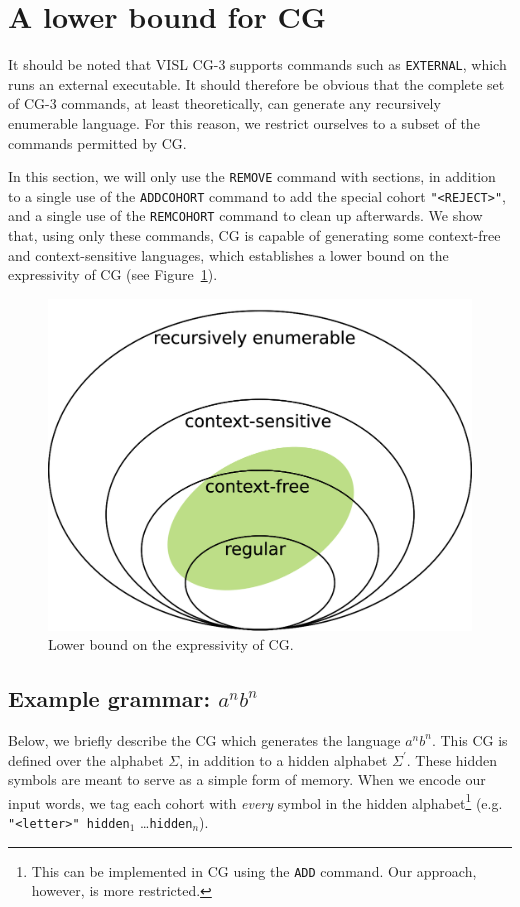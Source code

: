 \documentclass[11pt]{article}
\def\t#1{\texttt{#1}}
\begin{document}
\section{A lower bound for CG}

It should be noted that VISL CG-3 \cite{bick2015,vislcg3} supports commands 
such as \t{EXTERNAL}, which runs an external executable. It should therefore 
be obvious that the complete set of CG-3 commands, at least theoretically, 
can generate any recursively enumerable language. For this reason, we restrict 
ourselves to a subset of the commands permitted by CG.

In this section, we will only use the \t{REMOVE} command with sections, in
addition to a single use of the \t{ADDCOHORT} command to add the special cohort
\t{"<REJECT>"}, and a single use of the \t{REMCOHORT} command to clean up
afterwards. 
We show that, using only these commands, CG is capable of generating some
context-free and context-sensitive languages, which establishes a lower bound on 
the expressivity of CG (see Figure~\ref{fig:nocorr}).

\begin{figure}[h]
  \centering
  \includegraphics[width=0.8\linewidth]{chomsky}
  \caption{Lower bound on the expressivity of CG.}
  \label{fig:nocorr}
\end{figure}

\subsection{Example grammar: $a^nb^n$ }

Below, we briefly describe the CG which generates the language $a^nb^n$.
This CG is defined over the alphabet $\Sigma$, in addition to a hidden alphabet
$\Sigma^\prime$. These hidden symbols are meant to serve as a simple form of
memory. When we encode our input words, we tag each cohort with \emph{every}
symbol in the hidden alphabet\footnote{
  This can be implemented in CG using the \t{ADD} command.
  Our approach, however, is more restricted. 
} (e.g. \t{"<letter>" hidden$_1$} \dots \t{hidden$_n$}).
\end{document}
